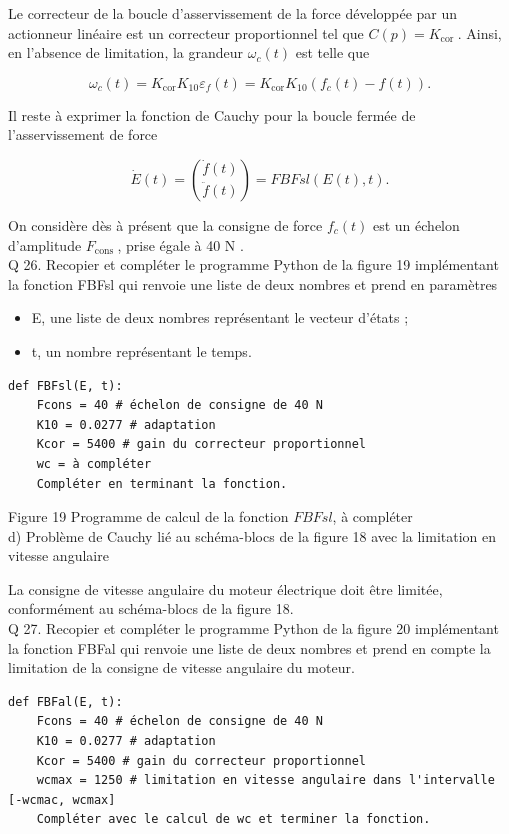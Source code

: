 \documentclass[10pt]{article}
\begin{document}
Le correcteur de la boucle d'asservissement de la force développée par un actionneur linéaire est un correcteur proportionnel tel que $C(p)=K_{\text {cor }}$. Ainsi, en l'absence de limitation, la grandeur $\omega_{c}(t)$ est telle que

$$
\omega_{c}(t)=K_{\operatorname{cor}} K_{10} \varepsilon_{f}(t)=K_{\operatorname{cor}} K_{10}\left(f_{c}(t)-f(t)\right) .
$$

Il reste à exprimer la fonction de Cauchy pour la boucle fermée de l'asservissement de force

$$
\dot{E}(t)=\binom{\dot{f}(t)}{\ddot{f}(t)}=F B F s l(E(t), t) .
$$

On considère dès à présent que la consigne de force $f_{c}(t)$ est un échelon d'amplitude $F_{\text {cons }}$, prise égale à 40 N .\\
Q 26. Recopier et compléter le programme Python de la figure 19 implémentant la fonction FBFsl qui renvoie une liste de deux nombres et prend en paramètres

\begin{itemize}
  \item E, une liste de deux nombres représentant le vecteur d'états ;
  \item t, un nombre représentant le temps.
\end{itemize}

\begin{verbatim}
def FBFsl(E, t):
    Fcons = 40 # échelon de consigne de 40 N
    K10 = 0.0277 # adaptation
    Kcor = 5400 # gain du correcteur proportionnel
    wc = à compléter
    Compléter en terminant la fonction.
\end{verbatim}

Figure 19 Programme de calcul de la fonction $F B F s l$, à compléter\\
d) Problème de Cauchy lié au schéma-blocs de la figure 18 avec la limitation en vitesse angulaire

La consigne de vitesse angulaire du moteur électrique doit être limitée, conformément au schéma-blocs de la figure 18.\\
Q 27. Recopier et compléter le programme Python de la figure 20 implémentant la fonction FBFal qui renvoie une liste de deux nombres et prend en compte la limitation de la consigne de vitesse angulaire du moteur.

\begin{verbatim}
def FBFal(E, t):
    Fcons = 40 # échelon de consigne de 40 N
    K10 = 0.0277 # adaptation
    Kcor = 5400 # gain du correcteur proportionnel
    wcmax = 1250 # limitation en vitesse angulaire dans l'intervalle [-wcmac, wcmax]
    Compléter avec le calcul de wc et terminer la fonction.
\end{verbatim}
\end{document}
